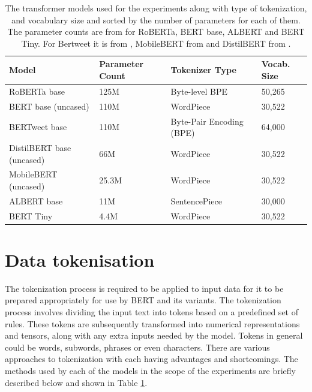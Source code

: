 \begin{table}[ht]
    \captionsetup{font=small}
    \small
    \centering
    \begin{tabularx}{\textwidth}{|l|X|l|X|}
        \hline
        \rowcolor[gray]{0.7}
        \textbf{Model}            & \textbf{Parameter Count} & \textbf{Tokenizer Type}  & \textbf{Vocab. Size} \\
        \hline
        RoBERTa base              & 125M                     & Byte-level BPE           & 50,265               \\
        \rowcolor[gray]{0.9}
        BERT base (uncased)       & 110M                     & WordPiece                & 30,522               \\
        BERTweet base             & 110M                     & Byte-Pair Encoding (BPE) & 64,000               \\
        \rowcolor[gray]{0.9}
        DistilBERT base (uncased) & 66M                      & WordPiece                & 30,522               \\
        MobileBERT (uncased)      & 25.3M                    & WordPiece                & 30,522               \\
        \rowcolor[gray]{0.9}
        ALBERT base               & 11M                      & SentencePiece            & 30,000               \\
        BERT Tiny                 & 4.4M                     & WordPiece                & 30,522               \\
        \hline
    \end{tabularx}
    \caption{The transformer models used for the experiments along with type of tokenization, and vocabulary size and sorted by the number of parameters for each of them. The parameter counts are from \cite{bhargavaGeneralizationNLIWays2021} for RoBERTa, BERT base, ALBERT and BERT Tiny. For Bertweet it is from \cite{nguyenBERTweetPretrainedLanguage2020}, MobileBERT from \cite{sunMobileBERTCompactTaskAgnostic2020} and DistilBERT from \cite{sanhDistilBERTDistilledVersion2020}.}
    \label{tab: model_dtls}
\end{table}

\section{Data tokenisation}
The tokenization process is required to be applied to input data for it to be prepared appropriately for use by BERT and its variants. The tokenization process involves dividing the input text into tokens based on a predefined set of rules. These tokens are subsequently transformed into numerical representations and tensors, along with any extra inputs needed by the model. Tokens in general could be words, subwords, phrases or even characters. There are various approaches to tokenization with each having advantages and shortcomings. The methods used by each of the models in the scope of the experiments are briefly described below and shown in Table \ref{tab: model_dtls}.

